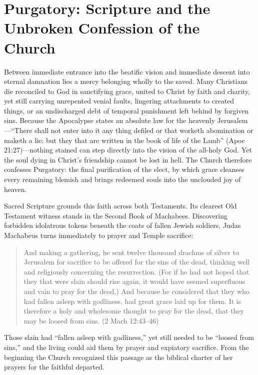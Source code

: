 \section{Purgatory: Scripture and the Unbroken Confession of the Church}

Between immediate entrance into the beatific vision and immediate descent into eternal damnation lies a mercy belonging wholly to the saved. Many Christians die reconciled to God in sanctifying grace, united to Christ by faith and charity, yet still carrying unrepented venial faults, lingering attachments to created things, or an undischarged debt of temporal punishment left behind by forgiven sins. Because the Apocalypse states an absolute law for the heavenly Jerusalem---``There shall not enter into it any thing defiled or that worketh abomination or maketh a lie: but they that are written in the book of life of the Lamb'' (Apoc 21:27)---nothing stained can step directly into the vision of the all-holy God. Yet the soul dying in Christ's friendship cannot be lost in hell. The Church therefore confesses Purgatory: the final purification of the elect, by which grace cleanses every remaining blemish and brings redeemed souls into the unclouded joy of heaven.

Sacred Scripture grounds this faith across both Testaments. Its clearest Old Testament witness stands in the Second Book of Machabees. Discovering forbidden idolatrous tokens beneath the coats of fallen Jewish soldiers, Judas Machabeus turns immediately to prayer and Temple sacrifice:

\begin{quote}
And making a gathering, he sent twelve thousand drachms of silver to Jerusalem for sacrifice to be offered for the sins of the dead, thinking well and religiously concerning the resurrection. (For if he had not hoped that they that were slain should rise again, it would have seemed superfluous and vain to pray for the dead,) And because he considered that they who had fallen asleep with godliness, had great grace laid up for them. It is therefore a holy and wholesome thought to pray for the dead, that they may be loosed from sins. (2 Mach 12:43--46)
\end{quote}

Those slain had ``fallen asleep with godliness,'' yet still needed to be ``loosed from sins,'' and the living could aid them by prayer and expiatory sacrifice. From the beginning the Church recognized this passage as the biblical charter of her prayers for the faithful departed.

